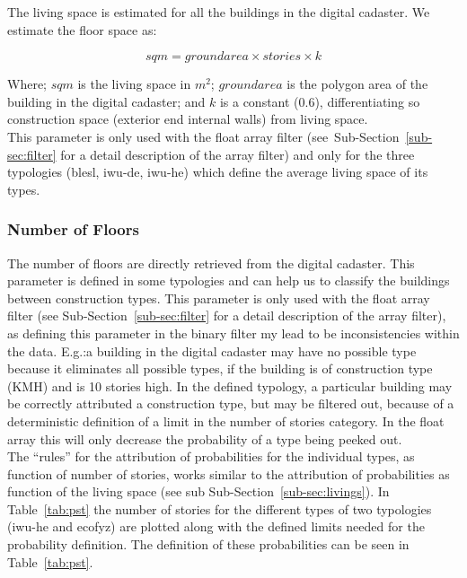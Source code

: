 

The living space is estimated for all the buildings in the digital cadaster.
We estimate the floor space as:

\begin{equation} \label{eq:space}
sqm = groundarea \times stories \times k
\end{equation}

Where; $sqm$ is the living space in $m^2$; $groundarea$ is the polygon area of
the building in the digital cadaster; and $k$ is a constant (0.6),
differentiating so construction space (exterior end internal walls) from living
space.\\

This parameter is only used with the float array filter
(see~Sub-Section~\ref{sub-sec:filter} for a detail description of the array
filter) and only for the three typologies (blesl, iwu-de, iwu-he) which define
the average living space of its types.\\



\subsubsection{Number of Floors}

The number of floors are directly retrieved from the digital cadaster. This
parameter is defined in some typologies and can help us to classify the
buildings between construction types. This parameter is only used with the
float array filter (see Sub-Section~\ref{sub-sec:filter} for a detail
description of the array filter), as defining this parameter in the binary
filter my lead to be inconsistencies within the data. E.g.:\@ a building in the
digital cadaster may have no possible type because it eliminates all possible
types, if the building is of construction type (KMH) and is 10 stories high.
In the defined typology, a particular building may be correctly attributed a
construction type, but may be filtered out, because of a deterministic
definition of a limit in the number of stories category.  In the float array
this will only decrease the probability of a type being peeked out.\\

The ``rules'' for the attribution of probabilities for the individual types, as
function of number of stories, works similar to the attribution of
probabilities as function of the living space (see sub
Sub-Section~\ref{sub-sec:livings}). In Table~\ref{tab:pst} the number of
stories for the different types of two typologies (iwu-he and ecofyz) are
plotted along with the defined limits needed for the probability definition.
The definition of these probabilities can be seen in Table~\ref{tab:pst}.\\

